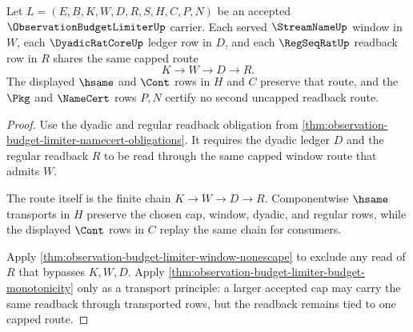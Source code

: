 \begin{theorem}
\label{thm:observation-budget-limiter-window-readback-exactness}
Let $L=(E,B,K,W,D,R,S,H,C,P,N)$ be an accepted $\ObservationBudgetLimiterUp$ carrier. Each served $\StreamNameUp$ window in $W$, each $\DyadicRatCoreUp$ ledger row in $D$, and each $\RegSeqRatUp$ readback row in $R$ shares the same capped route
$$
K \to W \to D \to R.
$$
The displayed $\hsame$ and $\Cont$ rows in $H$ and $C$ preserve that route, and the $\Pkg$ and $\NameCert$ rows $P,N$ certify no second uncapped readback route.
\end{theorem}
\begin{proof}
Use the dyadic and regular readback obligation from \autoref{thm:observation-budget-limiter-namecert-obligations}. It requires the dyadic ledger $D$ and the regular readback $R$ to be read through the same capped window route that admits $W$.

The route itself is the finite chain $K \to W \to D \to R$. Componentwise $\hsame$ transports in $H$ preserve the chosen cap, window, dyadic, and regular rows, while the displayed $\Cont$ rows in $C$ replay the same chain for consumers.

Apply \autoref{thm:observation-budget-limiter-window-nonescape} to exclude any read of $R$ that bypasses $K,W,D$. Apply \autoref{thm:observation-budget-limiter-budget-monotonicity} only as a transport principle: a larger accepted cap may carry the same readback through transported rows, but the readback remains tied to one capped route.
\end{proof}

